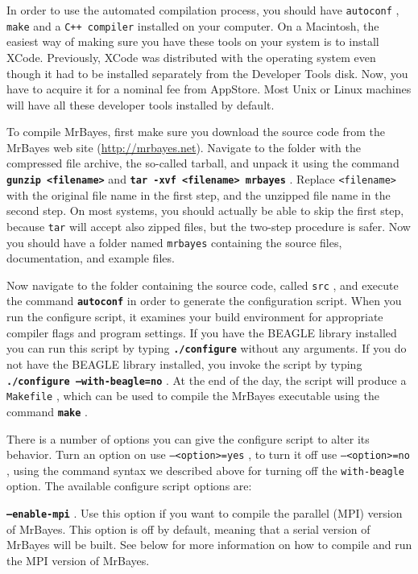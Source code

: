 \documentclass[12pt]{book}
\newcommand{\ttt}[1]{\texttt{#1} }
\newcommand{\tb}[1]{\texttt{\textbf{#1}} }
\begin{document}
In order to use the automated compilation process, you should have \ttt{autoconf}, \ttt{make} and a
\ttt{C++ compiler} installed on your computer. On a Macintosh, the easiest way of making sure you
have these tools on your system is to install XCode. Previously, XCode was distributed with the
operating system even though it had to be installed separately from the Developer Tools disk. Now,
you have to acquire it for a nominal fee from AppStore. Most Unix or Linux machines will have all
these developer tools installed by default.

To compile MrBayes, first make sure you download the source code from the MrBayes web site
(\url{http://mrbayes.net}). Navigate to the folder with the compressed file archive, the so-called
tarball, and unpack it using the command \tb{gunzip <filename>} and \tb{tar -xvf <filename>
mrbayes}. Replace \ttt{<filename>} with the original file name in the first step, and the unzipped
file name in the second step.  On most systems, you should actually be able to skip the first step,
because \ttt{tar} will accept also zipped files, but the two-step procedure is safer. Now you
should have a folder named \ttt{mrbayes} containing the source files, documentation, and example
files.

Now navigate to the folder containing the source code, called \ttt{src}, and execute the command
\tb{autoconf} in order to generate the configuration script.  When you run the configure script, it
examines your build environment for appropriate compiler flags and program settings. If you have
the BEAGLE library installed you can run this script by typing \tb{./configure} without any
arguments.  If you do not have the BEAGLE library installed, you invoke the script by typing
\tb{./configure --with-beagle=no}. At the end of the day, the script will produce a \ttt{Makefile},
which can be used to compile the MrBayes executable using the command \tb{make}.

There is a number of options you can give the configure script to alter its behavior. Turn an
option on use \ttt{--<option>=yes}, to turn it off use \ttt{--<option>=no}, using the command
syntax we described above for turning off the \ttt{with-beagle} option. The available configure
script options are:

\tb{--enable-mpi}. Use this option if you want to compile the parallel (MPI) version of MrBayes.
This option is off by default, meaning that a serial version of MrBayes will be built. See below
for more information on how to compile and run the MPI version of MrBayes.
\end{document}
